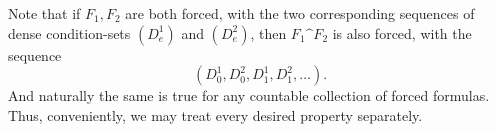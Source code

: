 \documentclass{amsart}
\begin{document}
	
	
	
	Note that if $F_1,F_2$ are both forced, with the two corresponding sequences of dense condition-sets $(D^1_e)$ and $(D^2_e)$, then $F_1\^F_2$ is also forced, with the sequence
	$$
	(D^1_0,D^2_0,D^1_1,D^2_1,\dots).
	$$
	And naturally the same is true for any countable collection of forced formulas. Thus, conveniently, we may treat every desired property separately.\\
	
\end{document}
